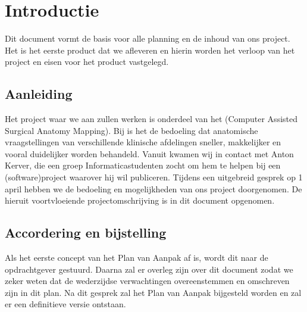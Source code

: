 \section{Introductie}

Dit document vormt de basis voor alle planning en de inhoud van ons project.
Het is het eerste product dat we afleveren en hierin worden het verloop van het project en eisen voor het product vastgelegd.

\subsection{Aanleiding}

Het project waar we aan zullen werken is onderdeel van het \casamproject (Computer Assisted Surgical Anatomy Mapping). 
Bij \casam is het de bedoeling dat anatomische vraagstellingen van verschillende klinische afdelingen sneller, makkelijker en vooral duidelijker worden behandeld.
Vanuit \casam kwamen wij in contact met Anton Kerver, die een groep Informaticastudenten zocht om hem te helpen bij een (software)project waarover hij wil publiceren.
Tijdens een uitgebreid gesprek op 1 april hebben we de bedoeling en mogelijkheden van ons project doorgenomen.
De hieruit voortvloeiende projectomschrijving is in dit document opgenomen.

\subsection{Accordering en bijstelling}

Als het eerste concept van het Plan van Aanpak af is, wordt dit naar de opdrachtgever gestuurd.
Daarna zal er overleg zijn over dit document zodat we zeker weten dat de wederzijdse verwachtingen overeenstemmen en omschreven zijn in dit plan.
Na dit gesprek zal het Plan van Aanpak bijgesteld worden en zal er een definitieve versie ontstaan.


